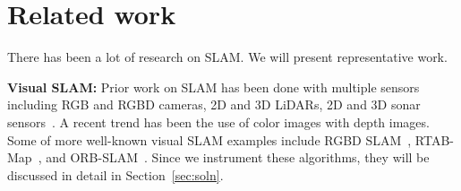 \section{Related work}
\label{sec:relwork}
There has been a lot of research on SLAM. We will present representative work. 

\textbf{Visual SLAM:} Prior work on SLAM has been done with multiple sensors including RGB and RGBD cameras, 2D and 3D LiDARs, 2D and 3D sonar sensors~\cite{burgard:rgbd-slam,cartographer}. 
A recent trend has been the use of color images with depth images. Some of more well-known visual SLAM examples include RGBD SLAM~\cite{burgard:rgbd-slam}, RTAB-Map~\cite{rtabmap}, and ORB-SLAM~\cite{orbslam}. 
Since we instrument these algorithms, they will be discussed in detail in Section~\ref{sec:soln}.

